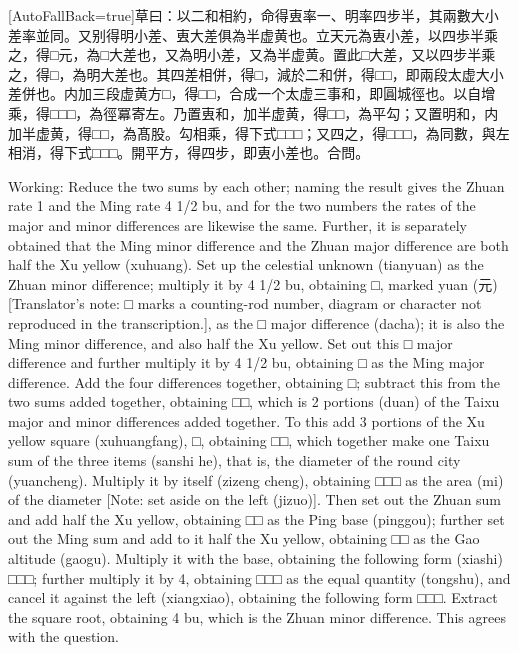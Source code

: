 \documentclass[11pt]{article}
\newcommand{\zhsmall}{\footnotesize\color{black!70}}
\newcommand{\unitlabel}[1]{\marginpar{\raggedleft\tiny\color{gray}#1}}
\newenvironment{unitzh}{\par\CJKfontspec{Noto Serif CJK SC}[AutoFallBack=true]\large\linespread{1.25}\selectfont}{\par}
\newenvironment{uniten}{\par\small\color{black!85}}{\par\medskip}
\begin{document}
\begin{unitzh}\unitlabel{ceyuan-025.7}草曰：以二和相約，命得叀率一、明率四步半，其兩數大小差率並同。又别得明小差、叀大差俱為半虚黄也。立天元為叀小差，以四歩半乘之，得□元，為□大差也，又為明小差，又為半虚黄。置此□大差，又以四步半乘之，得□，為明大差也。其四差相併，得□，減於二和併，得□□，即兩段太虚大小差併也。内加三段虚黄方□，得□□，合成一个太虚三事和，即圓城徑也。以自增乘，得□□□，為徑冪{\zhsmall 寄左}。乃置叀和，加半虚黄，得□□，為平勾；又置明和，内加半虚黄，得□□，為髙股。勾相乘，得下式□□□；又四之，得□□□，為同數，與左相消，得下式□□□。開平方，得四步，即叀小差也。合問。\end{unitzh}
\begin{uniten}Working: Reduce the two sums by each other; naming the result gives the Zhuan rate 1 and the Ming rate 4 1/2 bu, and for the two numbers the rates of the major and minor differences are likewise the same. Further, it is separately obtained that the Ming minor difference and the Zhuan major difference are both half the Xu yellow (xuhuang). Set up the celestial unknown (tianyuan) as the Zhuan minor difference; multiply it by 4 1/2 bu, obtaining □, marked yuan (元) [Translator's note: □ marks a counting-rod number, diagram or character not reproduced in the transcription.], as the □ major difference (dacha); it is also the Ming minor difference, and also half the Xu yellow. Set out this □ major difference and further multiply it by 4 1/2 bu, obtaining □ as the Ming major difference. Add the four differences together, obtaining □; subtract this from the two sums added together, obtaining □□, which is 2 portions (duan) of the Taixu major and minor differences added together. To this add 3 portions of the Xu yellow square (xuhuangfang), □, obtaining □□, which together make one Taixu sum of the three items (sanshi he), that is, the diameter of the round city (yuancheng). Multiply it by itself (zizeng cheng), obtaining □□□ as the area (mi) of the diameter [Note: set aside on the left (jizuo)]. Then set out the Zhuan sum and add half the Xu yellow, obtaining □□ as the Ping base (pinggou); further set out the Ming sum and add to it half the Xu yellow, obtaining □□ as the Gao altitude (gaogu). Multiply it with the base, obtaining the following form (xiashi) □□□; further multiply it by 4, obtaining □□□ as the equal quantity (tongshu), and cancel it against the left (xiangxiao), obtaining the following form □□□. Extract the square root, obtaining 4 bu, which is the Zhuan minor difference. This agrees with the question.\end{uniten}
\end{document}
